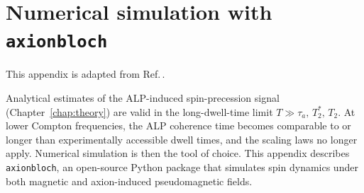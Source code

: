 \appendix

\chapter{Numerical simulation with \texttt{axionbloch}}\label{app:axionbloch}
\begin{jointwork}
    This appendix is adapted from Ref.\,\cite{Zhang_axionbloch}.
\end{jointwork}

Analytical estimates of the ALP-induced spin-precession signal (Chapter~\ref{chap:theory}) are valid in the long-dwell-time limit $T \gg \tau_a,\,T_2^*,\,T_2$. At lower Compton frequencies, the ALP coherence time becomes comparable to or longer than experimentally accessible dwell times, and the scaling laws no longer apply. Numerical simulation is then the tool of choice. This appendix describes \texttt{axionbloch}, an open-source Python package that simulates spin dynamics under both magnetic and axion-induced pseudomagnetic fields.






